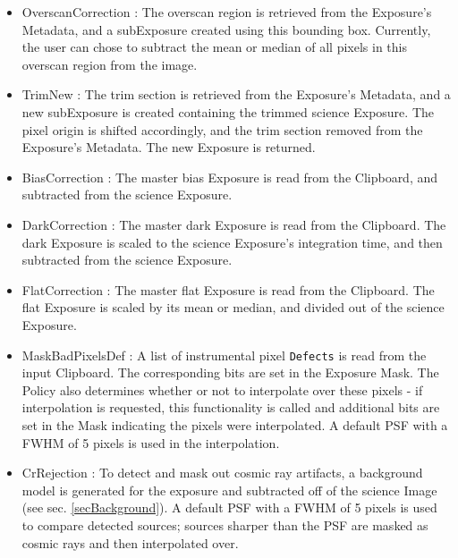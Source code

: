 \begin{itemize}
\item OverscanCorrection : The overscan region is retrieved from the
Exposure's Metadata, and a subExposure created using this bounding
box.  Currently, the user can chose to subtract the mean or median of
all pixels in this overscan region from the image.  

\item TrimNew : The trim section is retrieved from the Exposure's
Metadata, and a new subExposure is created containing the trimmed
science Exposure.  The pixel origin is shifted accordingly, and the
trim section removed from the Exposure's Metadata.  The new Exposure
is returned.

\item BiasCorrection : The master bias Exposure is read from the
Clipboard, and subtracted from the science Exposure.

\item DarkCorrection : The master dark Exposure is read from the
Clipboard.  The dark Exposure is scaled to the science Exposure's
integration time, and then subtracted from the science Exposure.

\item FlatCorrection : The master flat Exposure is read from the
Clipboard.  The flat Exposure is scaled by its mean or median, and
divided out of the science Exposure.

\iffalse
\item IlluminationCorrection : This is the same functionality as {\tt
FlatCorrection}.   \RHL{...but may need a different flat, depending on
how we handle the photometric v. cosmetic flats.}
\fi

\item MaskBadPixelsDef : A list of instrumental pixel \texttt{Defects} is read 
from the input Clipboard.  The corresponding bits are set in the
Exposure Mask.  The Policy also determines whether or not to
interpolate over these pixels - if interpolation is requested, this
functionality is called and additional bits are set in the Mask
indicating the pixels were interpolated.  A default PSF with a FWHM of
5 pixels is used in the interpolation.

\item CrRejection : To detect and mask out cosmic ray artifacts, a
background model is generated for the exposure and subtracted off of
the science Image (see sec. \ref{secBackground}).  A default PSF with
a FWHM of 5 pixels is used to compare detected sources; sources
sharper than the PSF are masked as cosmic rays and then interpolated
over. 


\end{itemize}
